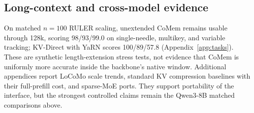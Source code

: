\subsection{Long-context and cross-model evidence}
On matched $n{=}100$ RULER scaling, unextended CoMem remains usable through
128k, scoring 98/93/99.0 on single-needle, multikey, and variable tracking;
KV-Direct with YaRN scores 100/89/57.8 (Appendix~\ref{app:tasks}). These are synthetic length-extension stress tests,
not evidence that CoMem is uniformly more accurate inside the backbone's native
window. Additional appendices report LoCoMo scale trends, standard KV
compression baselines with their full-prefill cost, and sparse-MoE ports.
They support portability of the interface, but the strongest controlled claims
remain the Qwen3-8B matched comparisons above.
